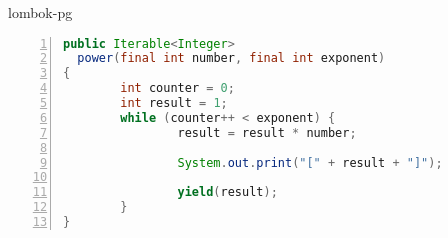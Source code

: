 \begin{frame}[fragile]{lombok-pg}
\begin{center}
\begin{lstlisting}[language=java, xleftmargin=15pt,
        basicstyle=\scriptsize,
        numbers=left,
        numbersep=5pt, escapechar=!]
public Iterable<Integer>
  power(final int number, final int exponent) 
{
        int counter = 0;
        int result = 1;
        while (counter++ < exponent) {
                result = result * number;

                System.out.print("[" + result + "]");

                yield(result);
        }
}
\end{lstlisting}
\end{center}
\par
\end{frame}